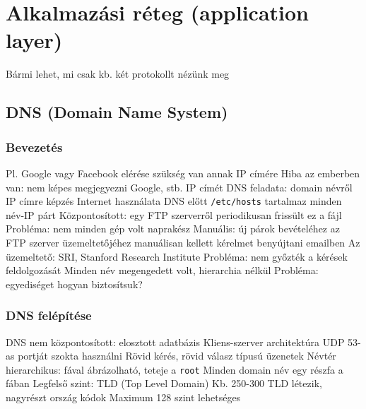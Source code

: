 \documentclass[12pt,a4paper]{article}
\begin{document}
\pagebreak

\section{Alkalmazási réteg (application layer)}

\begin{outline}
	\1 Bármi lehet, mi csak kb. két protokollt nézünk meg
\end{outline}

\subsection{DNS (Domain Name System)}

\subsubsection{Bevezetés}

\begin{outline}
	\1 Pl. Google vagy Facebook elérése szükség van annak IP címére
	\1 Hiba az emberben van: nem képes megjegyezni Google, stb. IP címét
	\1 DNS feladata: domain névről IP címre képzés
	\1 Internet használata DNS előtt
		\2 \texttt{/etc/hosts} tartalmaz minden név-IP párt
		\2 Központosított: egy FTP szerverről periodikusan frissült ez a fájl
			\3 Probléma: nem minden gép volt naprakész
		\2 Manuális: új párok bevételéhez az FTP szerver üzemeltetőjéhez manuálisan kellett kérelmet benyújtani emailben
			\3 Az üzemeltető: SRI, Stanford Research Institute
			\3 Probléma: nem győzték a kérések feldolgozását
		\2 Minden név megengedett volt, hierarchia nélkül
			\3 Probléma: egyediséget hogyan biztosítsuk?
\end{outline}

\subsubsection{DNS felépítése}

\begin{outline}
	\1 DNS nem központosított: elosztott adatbázis
	\1 Kliens-szerver architektúra
		\2 UDP 53-as portját szokta használni
		\2 Rövid kérés, rövid válasz típusú üzenetek
	\1 Névtér hierarchikus: fával ábrázolható, teteje a \texttt{root}
		\2 Minden domain név egy részfa a fában
		\2 Legfelső szint: TLD (Top Level Domain)
			\3 Kb. 250-300 TLD létezik, nagyrészt ország kódok
		\2 Maximum 128 szint lehetséges
\end{outline}
\end{document}
